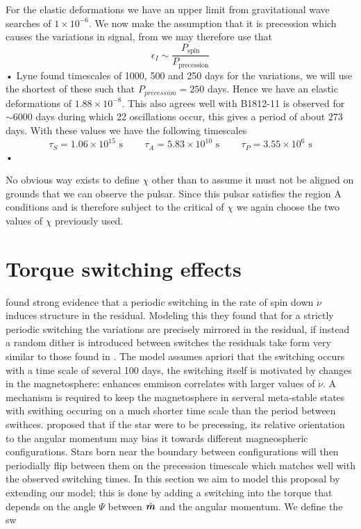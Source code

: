 \documentclass[11pt]{article}
\numberwithin{equation}{section}
\numberwithin{figure}{section}
\numberwithin{table}{section}
\begin{document}
For the elastic deformations we have an upper limit from gravitational wave searches of $1\times10^{-6}$. We now make the assumption that it is precession which causes the variations in signal, from \citet{Jones2001} we may therefore use that 
\begin{equation}
\epsilon_{I} \sim  \frac{P_{\textrm{spin}}}{P_{\textrm{precession}}}
\end{equation}•
Lyne found timescales of 1000, 500 and 250 days for the variations, we will use the shortest of these such that $P_{precession}=250$ days. Hence we have an elastic deformations of $1.88 \times10^{-8}$. This also agrees well with \citet{Lyne2010} B1812-11 is observed for $\sim6000$ days during which 22 oscillations occur, this gives a period of about $273$ days. 
With these values we have the following timescales
\begin{equation*}
\tau_{S}=1.06\times10^{15} \textrm{ s} \;\;\;\; \;\;\;\; \tau_{A}=5.83\times10^{10} \textrm{ s} \;\;\;\; \;\;\;\; \tau_{P}=3.55\times10^{6} \textrm{ s}
\end{equation*}•

No obvious way exists to define $\chi$ other than to assume it must not be aligned on grounds that we can observe the pulsar. Since this pulsar satisfies the region A conditions and is therefore subject to the critical of $\chi$ we again choose the two values of $\chi$ previously used.

\FloatBarrier
\section{Torque switching effects}

\citet{Lyne2010} found strong evidence that a periodic switching in the rate of
spin down $\dot\nu$ induces structure in the residual. Modeling this they found
that for a strictly periodic switching the variations are precisely mirrored in
the residual, if instead a random dither is introduced between switches the
residuals take form very similar to those found in \citet{Hobbs2010}. The model
assumes apriori that the switching occurs with a time scale of several 100
days, the switching itself is motivated by changes in the magnetosphere:
enhances emmison correlates with larger values of $\dot\nu$. A mechanism is
required to keep the magnetosphere in serveral meta-stable states with swithing
occuring on a much shorter time scale than the period between swithces.
\citet{Jones2010} %
proposed that if the star were to be precessing, its relative orientation to
the angular momentum may bias it towards different magneospheric
configurations. Stars born near the boundary between configurations will then
periodially flip between them on the precession timescale which matches well
with the observed switching times. In this section we aim to model this
proposal by extending our model; this is done by adding a switching into the
torque that depends on the angle $\Psi $ between $\hat{\boldsymbol{m}}$ and the angular
momentum. We define the sw
\end{document}
